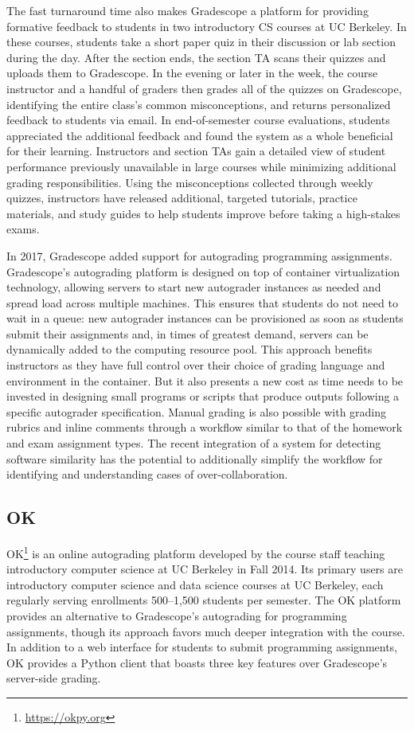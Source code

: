 The fast turnaround time also makes Gradescope a platform for providing formative feedback to students in two introductory CS courses at UC Berkeley. In these courses, students take a short paper quiz in their discussion or lab section during the day. After the section ends, the section TA scans their quizzes and uploads them to Gradescope. In the evening or later in the week, the course instructor and a handful of graders then grades all of the quizzes on Gradescope, identifying the entire class's common misconceptions, and returns personalized feedback to students via email. In end-of-semester course evaluations, students appreciated the additional feedback and found the system as a whole beneficial for their learning. Instructors and section TAs gain a detailed view of student performance previously unavailable in large courses while minimizing additional grading responsibilities. Using the misconceptions collected through weekly quizzes, instructors have released additional, targeted tutorials, practice materials, and study guides to help students improve before taking a high-stakes exams.

In 2017, Gradescope added support for autograding programming assignments. Gradescope's autograding platform is designed on top of container virtualization technology, allowing servers to start new autograder instances as needed and spread load across multiple machines. This ensures that students do not need to wait in a queue: new autograder instances can be provisioned as soon as students submit their assignments and, in times of greatest demand, servers can be dynamically added to the computing resource pool. This approach benefits instructors as they have full control over their choice of grading language and environment in the container. But it also presents a new cost as time needs to be invested in designing small programs or scripts that produce outputs following a specific autograder specification. Manual grading is also possible with grading rubrics and inline comments through a workflow similar to that of the homework and exam assignment types. The recent integration of a system for detecting software similarity has the potential to additionally simplify the workflow for identifying and understanding cases of over-collaboration.

\subsection{OK}

OK\footnote{\url{https://okpy.org}} is an online autograding platform developed by the course staff teaching introductory computer science at UC Berkeley in Fall 2014. Its primary users are introductory computer science and data science courses at UC Berkeley, each regularly serving enrollments 500--1,500 students per semester. The OK platform provides an alternative to Gradescope's autograding for programming assignments, though its approach favors much deeper integration with the course. In addition to a web interface for students to submit programming assignments, OK provides a Python client that boasts three key features over Gradescope's server-side grading.

